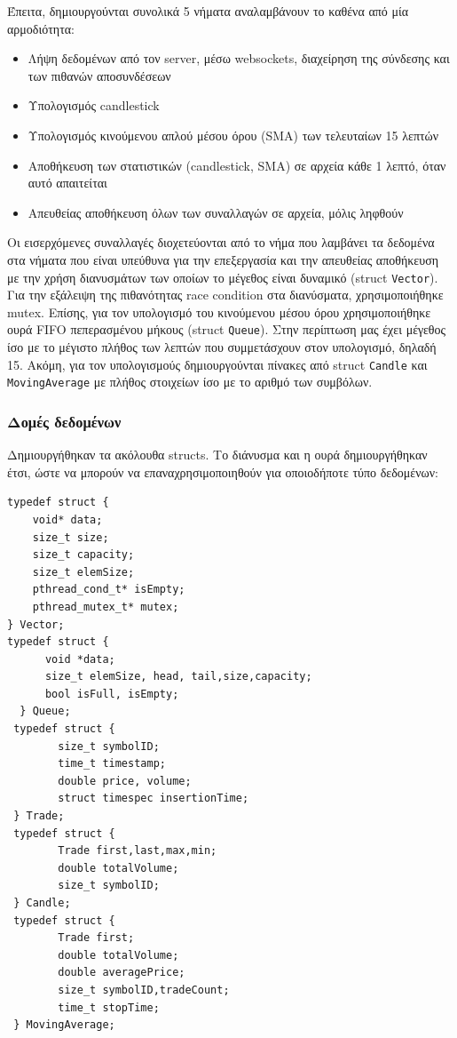 \documentclass[11pt]{article}
\begin{document}
Έπειτα, δημιουργούνται συνολικά 5 νήματα αναλαμβάνουν το καθένα από μία αρμοδιότητα:
\begin{itemize}
\item Λήψη δεδομένων από τον server, μέσω websockets, διαχείρηση της σύνδεσης και των πιθανών αποσυνδέσεων
\item Υπολογισμός candlestick
\item Υπολογισμός κινούμενου απλού μέσου όρου (SMA) των τελευταίων 15 λεπτών
\item Αποθήκευση των στατιστικών (candlestick, SMA) σε αρχεία κάθε 1 λεπτό, όταν αυτό απαιτείται
\item Απευθείας αποθήκευση όλων των συναλλαγών σε αρχεία, μόλις ληφθούν
\end{itemize}

Οι εισερχόμενες συναλλαγές διοχετεύονται από το νήμα που λαμβάνει τα δεδομένα στα νήματα που είναι υπεύθυνα για την επεξεργασία και την απευθείας αποθήκευση με την χρήση διανυσμάτων των οποίων το μέγεθος είναι δυναμικό (struct \texttt{Vector}). Για την εξάλειψη της πιθανότητας race condition στα διανύσματα, χρησιμοποιήθηκε mutex. Επίσης, για τον υπολογισμό του κινούμενου μέσου όρου χρησιμοποιήθηκε ουρά FIFO πεπερασμένου μήκους (struct \texttt{Queue}). Στην περίπτωση μας έχει μέγεθος ίσο με το μέγιστο πλήθος των λεπτών που συμμετάσχουν στον υπολογισμό, δηλαδή 15. Ακόμη, για τον υπολογισμούς δημιουργούνται πίνακες από struct \texttt{Candle} και \texttt{MovingAverage} με πλήθος στοιχείων ίσο με το αριθμό των συμβόλων.

\subsubsection{Δομές δεδομένων}
\label{sec:org5aeb49f}
Δημιουργήθηκαν τα ακόλουθα structs. Το διάνυσμα και η ουρά δημιουργήθηκαν έτσι, ώστε να μπορούν να επαναχρησιμοποιηθούν για οποιοδήποτε τύπο δεδομένων:
\begin{verbatim}
typedef struct {
    void* data;
    size_t size;
    size_t capacity;
    size_t elemSize;
    pthread_cond_t* isEmpty;
    pthread_mutex_t* mutex;
} Vector;
typedef struct {
      void *data;
      size_t elemSize, head, tail,size,capacity;
      bool isFull, isEmpty;
  } Queue;
 typedef struct {
        size_t symbolID;
        time_t timestamp;
        double price, volume;
        struct timespec insertionTime;
 } Trade;
 typedef struct {
        Trade first,last,max,min;
        double totalVolume;
        size_t symbolID;
 } Candle;
 typedef struct {
        Trade first;
        double totalVolume;
        double averagePrice;
        size_t symbolID,tradeCount;
        time_t stopTime;
 } MovingAverage;
\end{verbatim}
\end{document}
